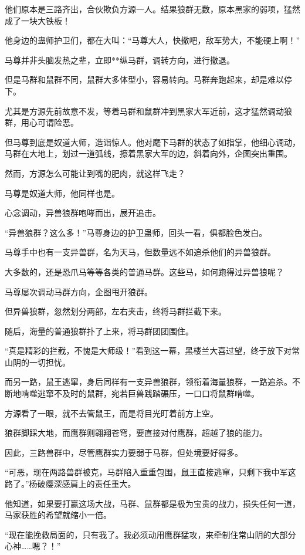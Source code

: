 \begin{this_body}
他们原本是三路齐出，合伙欺负方源一人。结果狼群无数，原本黑家的弱项，猛然成了一块大铁板！

他身边的蛊师护卫们，都在大叫：“马尊大人，快撤吧，敌军势大，不能硬上啊！”

马尊并非头脑发热之辈，立即**纵马群，调转方向，进行撤退。

但是马群和鼠群不同，鼠群大多体型小，容易转向。马群奔跑起来，却是难以停下。

尤其是方源先前故意不发，等着马群和鼠群冲到黑家大军近前，这才猛然调动狼群，用心可谓险恶。

但马尊到底是奴道大师，造诣惊人。他对麾下马群的状态了如指掌，他细心调动，马群在大地上，划过一道弧线，擦着黑家大军的边，斜着向外，企图突出重围。

然而，方源怎么可能让到嘴的肥肉，就这样飞走？

马尊是奴道大师，他同样也是。

心念调动，异兽狼群咆哮而出，展开追击。

“异兽狼群？这么多！”马尊身边的护卫蛊师，回头一看，俱都脸色发白。

马尊手中也有一支异兽群，名为天马，但数量远不如追杀他们的异兽狼群。

大多数的，还是恐爪马等等各类的普通马群。这些马，如何跑得过异兽狼呢？

马尊屡次调动马群方向，企图甩开狼群。

但异兽狼群，忽然划分两部，左右夹击，终将马群拦截下来。

随后，海量的普通狼群扑了上来，将马群团团围住。

“真是精彩的拦截，不愧是大师级！”看到这一幕，黑楼兰大喜过望，终于放下对常山阴的一切担忧。

而另一路，鼠王逃窜，身后同样有一支异兽狼群，领衔着海量狼群，一路追杀。不断地啃噬逃窜不及时的鼠群，宛若巨兽践踏碾压，一口口将鼠群啃噬。

方源看了一眼，就不去管鼠王，而是将目光盯着前方上空。

狼群脚踩大地，而鹰群则翱翔苍穹，要直接对付鹰群，超越了狼的能力。

因此，三路兽群中，尽管鹰群实力要弱于马群，但处境要好得多。

“可恶，现在两路兽群被克，马群陷入重重包围，鼠王直接逃窜，只剩下我中军这路了。”杨破缨深感肩上的责任重大。

他知道，如果要打赢这场大战，马群、鼠群都是极为宝贵的战力，损失任何一道，马家获胜的希望就缩小一倍。

“现在能挽救局面的，只有我了。我必须动用鹰群猛攻，来牵制住常山阴的大部分心神……嗯？！”


\end{this_body}
